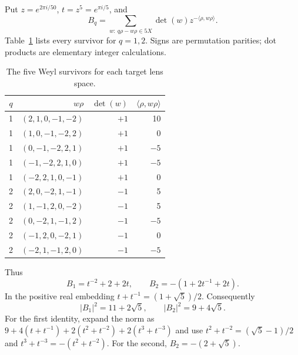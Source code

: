 \documentclass[11pt]{article}
\begin{document}
Put $z=e^{2\pi i/50}$, $t=z^5=e^{\pi i/5}$, and
\[
B_q=\sum_{w:\ q\rho-w\rho\in5X}\det(w)z^{-\langle\rho,w\rho\rangle}.
\]
Table~\ref{tab:survivors} lists every survivor for $q=1,2$. Signs are
permutation parities; dot products are elementary integer calculations.
\begin{table}[ht]
\centering
\begin{tabular}{c r r r}
\toprule
$q$ & $w\rho$ & $\det(w)$ & $\langle\rho,w\rho\rangle$\\
\midrule
1 & $(2,1,0,-1,-2)$ & $+1$ & 10\\
1 & $(1,0,-1,-2,2)$ & $+1$ & 0\\
1 & $(0,-1,-2,2,1)$ & $+1$ & $-5$\\
1 & $(-1,-2,2,1,0)$ & $+1$ & $-5$\\
1 & $(-2,2,1,0,-1)$ & $+1$ & 0\\
\midrule
2 & $(2,0,-2,1,-1)$ & $-1$ & 5\\
2 & $(1,-1,2,0,-2)$ & $-1$ & 5\\
2 & $(0,-2,1,-1,2)$ & $-1$ & $-5$\\
2 & $(-1,2,0,-2,1)$ & $-1$ & 0\\
2 & $(-2,1,-1,2,0)$ & $-1$ & $-5$\\
\bottomrule
\end{tabular}
\caption{The five Weyl survivors for each target lens space.}\label{tab:survivors}
\end{table}
Thus
\begin{equation}
B_1=t^{-2}+2+2t,\qquad B_2=-(1+2t^{-1}+2t).
\label{eq:B}
\end{equation}
In the positive real embedding $t+t^{-1}=(1+\sqrt5)/2$. Consequently
\begin{equation}
|B_1|^2=11+2\sqrt5,\qquad |B_2|^2=9+4\sqrt5.
\label{eq:norms}
\end{equation}
For the first identity, expand the norm as
$9+4(t+t^{-1})+2(t^2+t^{-2})+2(t^3+t^{-3})$ and use
$t^2+t^{-2}=(\sqrt5-1)/2$ and $t^3+t^{-3}=-(t^2+t^{-2})$.
For the second, $B_2=-(2+\sqrt5)$.
\end{document}
